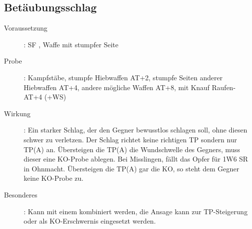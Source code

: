\subsection{Betäubungsschlag}
\label{aktion.betaeubungsschlag}
\begin{description}
    \item[Voraussetzung]:
        SF , Waffe mit stumpfer Seite
    \item[Probe]:
        Kampfstäbe, stumpfe Hiebwaffen AT+2, stumpfe Seiten anderer Hiebwaffen AT+4, andere mögliche Waffen AT+8, mit Knauf Raufen-AT+4 (+WS)
    \item[Wirkung]:
        Ein starker Schlag, der den Gegner bewusstlos schlagen soll, ohne diesen schwer zu verletzen.
        Der Schlag richtet keine richtigen TP sondern nur TP(A) an.
        Übersteigen die TP(A) die Wundschwelle des Gegners, muss dieser eine KO-Probe ablegen.
        Bei Misslingen, fällt das Opfer für 1W6 SR in Ohnmacht.
        Übersteigen die TP(A) gar die KO, so steht dem Gegner keine KO-Probe zu.
    \item[Besonderes]:
        Kann mit einem  kombiniert werden, die Ansage kann zur TP-Steigerung oder als KO-Erschwernis eingesetzt werden.
\end{description}
